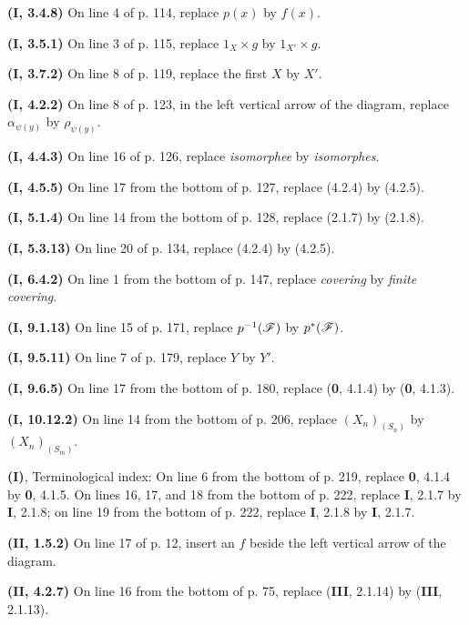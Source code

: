 \noindent\textbf{(\textbf{I}, 3.4.8)} On line 4 of p. 114, replace $p(x)$ by $f(x)$.

\noindent\textbf{(\textbf{I}, 3.5.1)} On line 3 of p. 115, replace $1_X\times g$ by
$1_{X'}\times g$.

\noindent\textbf{(\textbf{I}, 3.7.2)} On line 8 of p. 119, replace the first $X$ by
$X'$.

\noindent\textbf{(\textbf{I}, 4.2.2)} On line 8 of p. 123, in the left vertical arrow
of the diagram, replace $\alpha_{\psi(y)}$ by $\rho_{\psi(y)}$.

\noindent\textbf{(\textbf{I}, 4.4.3)} On line 16 of p. 126, replace \emph{isomorphee}
by \emph{isomorphes}.

\noindent\textbf{(\textbf{I}, 4.5.5)} On line 17 from the bottom of p. 127, replace
(4.2.4) by (4.2.5).

\noindent\textbf{(\textbf{I}, 5.1.4)} On line 14 from the bottom of p. 128, replace
(2.1.7) by (2.1.8).

\noindent\textbf{(\textbf{I}, 5.3.13)} On line 20 of p. 134, replace (4.2.4) by
(4.2.5).

\noindent\textbf{(\textbf{I}, 6.4.2)} On line 1 from the bottom of p. 147, replace
\emph{covering} by \emph{finite covering}.

\noindent\textbf{(\textbf{I}, 9.1.13)} On line 15 of p. 171, replace
$p^{-1}(\mathscr{F})$ by $p^*(\mathscr{F})$.

\noindent\textbf{(\textbf{I}, 9.5.11)} On line 7 of p. 179, replace $Y$ by $Y'$.

\noindent\textbf{(\textbf{I}, 9.6.5)} On line 17 from the bottom of p. 180, replace
(\textbf{0}, 4.1.4) by (\textbf{0}, 4.1.3).

\noindent\textbf{(\textbf{I}, 10.12.2)} On line 14 from the bottom of p. 206, replace
$(X_n)_{(S_n)}$ by $(X_n)_{(S_m)}$.

\clearpage
{}
\noindent\textbf{(I)}, Terminological index: On line 6 from the bottom of p.
219, replace \textbf{0}, 4.1.4 by \textbf{0}, 4.1.5. On lines 16, 17, and 18 from the bottom of
p. 222, replace \textbf{I}, 2.1.7 by \textbf{I}, 2.1.8; on line 19 from the bottom of p. 222,
replace \textbf{I}, 2.1.8 by \textbf{I}, 2.1.7.

\noindent\textbf{(\textbf{II}, 1.5.2)} On line 17 of p. 12, insert an $f$ beside the
left vertical arrow of the diagram.

\noindent\textbf{(\textbf{II}, 4.2.7)} On line 16 from the bottom of p. 75, replace
(\textbf{III}, 2.1.14) by (\textbf{III}, 2.1.13).

